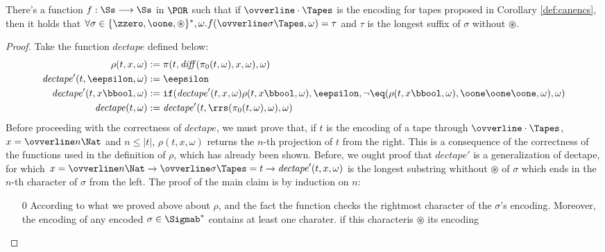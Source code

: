 \begin{conditional}{\notappendix}
    \begin{lemma}
      \label{lemma:dectape}
      There's a function $f :
      \Ss \longrightarrow \Ss$ in $\POR$
      such that if $\ovverline \cdot \Tapes$ is the encoding for tapes
      proposed in Corollary \ref{def:canencs}, then it holds that
      $\forall \sigma \in \{\zzero, \oone, \circledast\}^*, \omega.
       f(\ovverline \sigma \Tapes, \omega)=
      \tau$ and $\tau$ is the longest suffix of $\sigma$ without $\circledast$.
    \end{lemma}
    \begin{proof}
      Take the function $\mathit{dectape}$ defined below:
      \begin{align*}
        \rho(t, x, \omega)&:= \pi(t, \mathit{diff}(\pi_0(t, \omega),
        x, \omega), \omega)\\
        \mathit{dectape}'(t, \eepsilon, \omega) &:= \eepsilon\\
        \mathit{dectape}'(t, x\bbool, \omega) &:= \mathtt{if}(
        \mathit{dectape}'(t, x, \omega)\rho(t, x\bbool, \omega),
        \eepsilon, \lnot \eq(\rho(t, x\bbool, \omega),
        \oone\oone\oone, \omega), \omega)\\
        \mathit{dectape}(t, \omega) &:= \mathit{dectape}'(t,
        \rrs(\pi_0(t, \omega), \omega), \omega)
      \end{align*}
      Before proceeding with the correctness of $\mathit{dectape}$, we must prove
      that, if $t$ is the encoding of a tape through $\ovverline \cdot \Tapes$, $x=\ovverline n\Nat$ and $n \le |t|$, $\rho(t, x, \omega)$ returns the $n$-th
      projection of $t$ from the right. This is a consequence of the correctness
      of the functions used in the definition of $\rho$, which has already been shown.
      Before, we ought proof that $\mathit{dectape}'$ is a generalization of dectape,
      for which $x=\ovverline n\Nat \to \ovverline \sigma \Tapes = t \to
      \mathit{dectape}'(t, x, \omega)$ is the longest substring whithout
      $\circledast$ of $\sigma$ which ends in
      the $n$-th character of $\sigma$ from the left.
      The proof of the main claim is by induction on $n$:
      \begin{itemize}
        \item[$0$] According to what we proved above about $\rho$, and the fact the
        function checks the rightmost character of the $\sigma$'s encoding. Moreover,
        the encoding of any encoded $\sigma \in \Sigmab^*$ contains at least one
        charater. if this characteris $\circledast$ its encoding

\end{itemize}
\end{proof}
\end{conditional}
